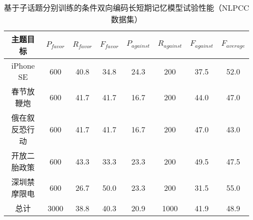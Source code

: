 


\begin{table}[htbp]
	\caption[table123]{基于子话题分别训练的条件双向编码长短期记忆模型试验性能（NLPCC数据集）}
	\label{chinesedata}
	\vspace{0.5em}\centering\wuhao
	\begin{tabular}{cccccccc}
		\toprule[1.5pt]
		主题目标& $P_{favor}$&$R_{favor}$&$F_{favor}$&$P_{against}$&$R_{against}$&$F_{against}$&$F_{average}$ \\
		\midrule[1pt]
		iPhone SE&600&40.8&34.8&24.3&200&37.5&52.0\\
		春节放鞭炮&600&41.7&41.7&16.7&200&44.0&47.0\\
		俄在叙反恐行动&600&41.7&41.7&16.7&200&47.0&43.0\\
		开放二胎政策&600&43.3&33.3&23.3&200&49.5&47.5\\
		深圳禁摩限电&600&26.7&50.0&23.3&200&31.5&55.0\\
		总计&3000&38.8&40.3&20.9&1000&41.9&48.9\\
		\bottomrule[1.5pt]
	\end{tabular}
\end{table}

